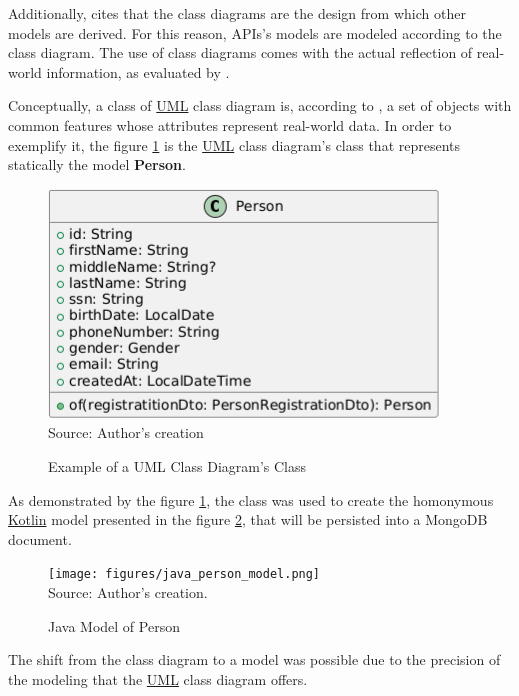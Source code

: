 Additionally, \cite{nanthaamornphong2019extended} cites that the class diagrams are the design from which other models are derived. For this reason, APIs's models are modeled according to the class diagram. The use of class diagrams comes with the actual reflection of real-world information, as evaluated by \cite{vo2020transformation}. 

Conceptually, a class of \hyperref[appendix:glossary]{UML} class diagram is, according to \cite{BERARDI200570, vo2020transformation}, a set of objects with 
common features whose attributes represent real-world data. In order to exemplify it, the figure \ref{fig:person_class} is the \hyperref[appendix:glossary]{UML} class diagram's class that represents statically the model \textbf{Person}. 

\begin{figure}[H]
    \caption{Example of a UML Class Diagram's Class}
    \centering
    \includegraphics[width=0.87\linewidth]{figures/api/person_class.png}
    \label{fig:person_class}
    \\ \footnotesize Source: Author's creation
\end{figure}

As demonstrated by the figure \ref{fig:person_class}, the class was used to create the homonymous \hyperref[appendix:glossary]{Kotlin} model presented in the figure \ref{fig:kotlin_person_model}, that will be persisted into a MongoDB document. 

\begin{figure}[H]
    \centering
    \caption{Java Model of Person}
    \texttt{[image: figures/java\_person\_model.png]}
    \label{fig:kotlin_person_model}
    \\ \footnotesize Source: Author's creation.
\end{figure}

The shift from the class diagram to a model was possible due to the precision of the modeling that the \hyperref[appendix:glossary]{UML} class diagram offers.

